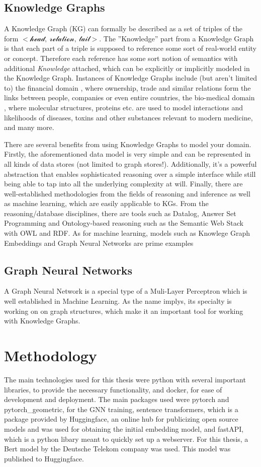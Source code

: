 \documentclass[draft,final]{vutinfth} %
\begin{document}
\section{Knowledge Graphs}
A Knowledge Graph (KG) can formally be described as a set of triples of the form 
$\mathcal{< head,\ relation,\ tail>}$. The ''Knowledge'' part from a Knowledge Graph is that each part of a triple is supposed to reference some sort of real-world entity or concept. Therefore each reference has some sort notion of semantics with additional \textit{Knowledge} attached, which can be explicitly or implicitly modeled in the Knowledge Graph. Instances of Knowledge Graphs include (but aren't limited to) the financial domain \cite{Bellomarini_Magnanimi_Nissl_Sallinger_2021}, where ownership, trade and similar relations form the links between people, companies or even entire countries, the bio-medical domain \cite{Lu_Goi_Zhao_Wang_2025}, where molecular structures, proteins etc. are used to model interactions and likelihoods of diseases, toxins and other substances relevant to modern medicine, and many more.

There are several benefits from using Knowledge Graphs to model your domain. Firstly, the aforementioned data model is very simple and can be represented in all kinds of data stores (not limited to graph stores!). Additionally, it's a powerful abstraction that enables sophisticated reasoning over a simple interface while still being able to tap into all the underlying complexity at will. Finally, there are well-established methodologies from the fields of reasoning and inference as well as machine learning, which are easily applicable to KGs. From the reasoning/database disciplines, there are tools such as Datalog, Answer Set Programming and Ontology-based reasoning such as the Semantic Web Stack with OWL and RDF. As for machine learning, models such as Knowlege Graph Embeddings and Graph Neural Networks are prime examples


\section{Graph Neural Networks}
A Graph Neural Network is a special type of a Muli-Layer Perceptron which is well established in Machine Learning. As the name implys, its specialty is working on on graph structures, which make it an important tool for working with Knowledge Graphs. 

\chapter{Methodology}
The main technologies used for this thesis were python with several important libraries, to provide the necessary functionality, and docker, for ease of development and deployment. The main packages used were pytorch and pytorch\_geometric, for the GNN training, sentence transformers, which is a package provided by Huggingface, an online hub for publicizing open source models and was used for obtaining the initial embedding model, and fastAPI, which is a python libary meant to quickly set up a webserver.
For this thesis, a Bert model by the Deutsche Telekom company was used. This model was published to Huggingface. \cite{german_bert}
\end{document}
